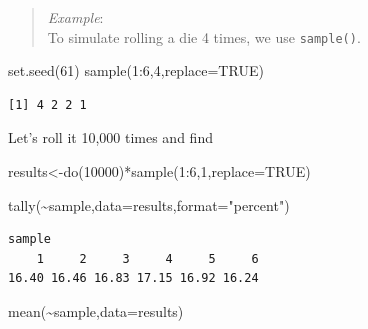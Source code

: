 \documentclass[
  letterpaper,
  DIV=11,
  numbers=noendperiod]{scrreprt}
\newenvironment{Shaded}{\begin{snugshade}}{\end{snugshade}}
\newcommand{\AttributeTok}[1]{\textcolor[rgb]{0.40,0.45,0.13}{#1}}
\newcommand{\ConstantTok}[1]{\textcolor[rgb]{0.56,0.35,0.01}{#1}}
\newcommand{\DecValTok}[1]{\textcolor[rgb]{0.68,0.00,0.00}{#1}}
\newcommand{\FunctionTok}[1]{\textcolor[rgb]{0.28,0.35,0.67}{#1}}
\newcommand{\NormalTok}[1]{\textcolor[rgb]{0.00,0.23,0.31}{#1}}
\newcommand{\OtherTok}[1]{\textcolor[rgb]{0.00,0.23,0.31}{#1}}
\newcommand{\SpecialCharTok}[1]{\textcolor[rgb]{0.37,0.37,0.37}{#1}}
\newcommand{\StringTok}[1]{\textcolor[rgb]{0.13,0.47,0.30}{#1}}
\begin{document}
\begin{quote}
\emph{Example}:\\
To simulate rolling a die 4 times, we use \texttt{sample()}.
\end{quote}

\begin{Shaded}
\begin{Highlighting}[]
\FunctionTok{set.seed}\NormalTok{(}\DecValTok{61}\NormalTok{)}
\FunctionTok{sample}\NormalTok{(}\DecValTok{1}\SpecialCharTok{:}\DecValTok{6}\NormalTok{,}\DecValTok{4}\NormalTok{,}\AttributeTok{replace=}\ConstantTok{TRUE}\NormalTok{)}
\end{Highlighting}
\end{Shaded}

\begin{verbatim}
[1] 4 2 2 1
\end{verbatim}

Let's roll it 10,000 times and find

\begin{Shaded}
\begin{Highlighting}[]
\NormalTok{results}\OtherTok{\textless{}{-}}\FunctionTok{do}\NormalTok{(}\DecValTok{10000}\NormalTok{)}\SpecialCharTok{*}\FunctionTok{sample}\NormalTok{(}\DecValTok{1}\SpecialCharTok{:}\DecValTok{6}\NormalTok{,}\DecValTok{1}\NormalTok{,}\AttributeTok{replace=}\ConstantTok{TRUE}\NormalTok{)}
\end{Highlighting}
\end{Shaded}

\begin{Shaded}
\begin{Highlighting}[]
\FunctionTok{tally}\NormalTok{(}\SpecialCharTok{\textasciitilde{}}\NormalTok{sample,}\AttributeTok{data=}\NormalTok{results,}\AttributeTok{format=}\StringTok{"percent"}\NormalTok{)}
\end{Highlighting}
\end{Shaded}

\begin{verbatim}
sample
    1     2     3     4     5     6 
16.40 16.46 16.83 17.15 16.92 16.24 
\end{verbatim}

\begin{Shaded}
\begin{Highlighting}[]
\FunctionTok{mean}\NormalTok{(}\SpecialCharTok{\textasciitilde{}}\NormalTok{sample,}\AttributeTok{data=}\NormalTok{results)}
\end{Highlighting}
\end{Shaded}
\end{document}

